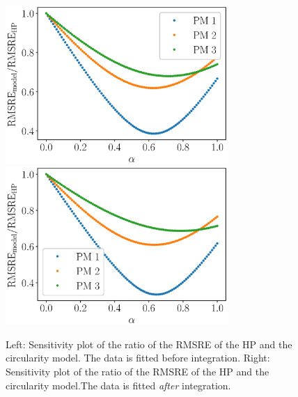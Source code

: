 \documentclass[draft,jgrga]{agutexSI2019}
\begin{document}
\begin{figure}
\includegraphics[height=6cm]{figures/RMSRE_consistent_alpha.eps}
\includegraphics[height=6cm]{figures/RMSRE_consistent_alpha_integral.eps}
\caption{Left: Sensitivity plot of the ratio of the RMSRE of the HP and the circularity model. The data is fitted before integration. Right: Sensitivity plot of the ratio of the RMSRE of the HP and the circularity model.The data is fitted \textit{after} integration. }
\label{fig:sensitivity_plot_alpha}
\end{figure}






\end{document}
